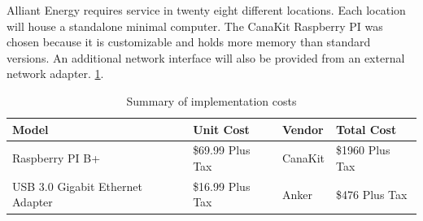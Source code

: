 Alliant Energy requires service in twenty eight different locations. Each location will house a standalone minimal computer. The CanaKit Raspberry PI was chosen because it is customizable and holds more memory than standard versions. An additional network interface will also be provided from an external network adapter. \ref{table:cost}.

\vspace{0.5cm}
\begin{table}[h]
\centering
\begin{tabular}{l l l l}
Model & Unit Cost & Vendor & Total Cost \\
\hline
Raspberry PI B+ & \$69.99 Plus Tax & CanaKit & \$1960 Plus Tax\footnotemark \\
\hline
USB 3.0 Gigabit Ethernet Adapter & \$16.99 Plus Tax & Anker & \$476 Plus Tax\footnotemark\\
\end{tabular}
\caption{Summary of implementation costs}
\label{table:cost}
\end{table}
\vspace{0.5cm}

\addtocounter{footnote}{-1}

\addtocounter{footnote}{1}
